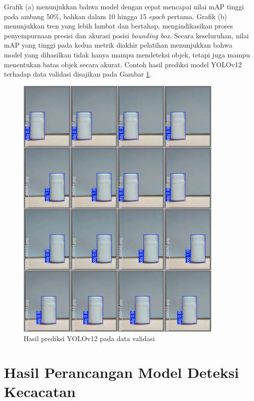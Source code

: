 Grafik (a) menunjukkan bahwa model dengan cepat mencapai nilai mAP
tinggi pada ambang 50\%, bahkan dalam 10 hingga 15 \textit{epoch} pertama.
Grafik (b) menunjukkan tren yang lebih lambat dan bertahap,
mengindikasikan proses penyempurnaan presisi dan akurasi posisi
\textit{bounding box}. Secara keseluruhan, nilai mAP yang tinggi pada
kedua metrik diakhir
pelatihan menunjukkan bahwa model yang dihasilkan tidak hanya mampu
mendeteksi objek, tetapi juga mampu menentukan batas objek secara akurat.
Contoh hasil prediksi model YOLOv12 terhadap data validasi disajikan
pada Gambar \ref{fig:yolo-validasi}.

\begin{figure}[H]
  \centering
  \includegraphics[width=0.90\textwidth]{gambar/yolo_validasi.jpg}
  \caption{Hasil prediksi YOLOv12 pada data validasi}
  \label{fig:yolo-validasi}
\end{figure}
\vspace{-1em}

\vspace{1em}

\section{Hasil Perancangan Model Deteksi Kecacatan}
